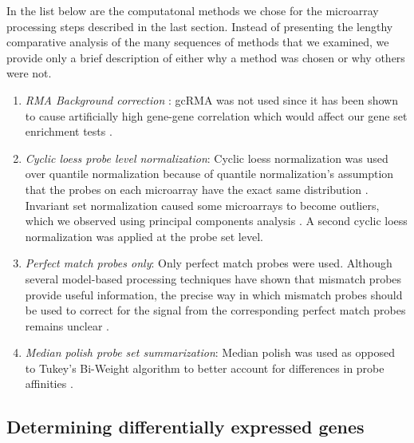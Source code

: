 In the list below are the computatonal methods we chose for the microarray
processing steps described in the last section. 
Instead of presenting the lengthy comparative analysis of the many
sequences of methods that we examined, we provide only a brief description of either 
why a method was chosen or why others were not.

\begin{enumerate}
  \item \emph{RMA Background correction} \cite{Irizarry:2003ge}: 
  gcRMA\cite{Wu:2004wh} was not used since it
  has been shown to cause artificially high gene-gene correlation which
  would affect our gene set enrichment tests \cite{Lim:2007gc}.
  
  \item \emph{Cyclic loess probe level normalization}: Cyclic loess normalization was 
  used over quantile normalization because of quantile normalization's assumption
  that the probes on each microarray have the exact same 
  distribution \cite{Ballman:2004ee}. Invariant
  set normalization caused some microarrays to become outliers, which we observed
  using principal components analysis \cite{Li:2001wk}. A second cyclic loess normalization was applied
  at the probe set level.
  
  \item \emph{Perfect match probes only}: Only perfect match probes were used.
  Although several model-based processing techniques have shown that mismatch
  probes provide useful information, the precise way in which mismatch probes should
  be used to correct for the signal from the corresponding perfect match 
  probes remains unclear \cite{Wang:2007dy}.
  
  \item \emph{Median polish probe set summarization}: Median polish was 
  used as opposed to Tukey's Bi-Weight algorithm to better account for 
  differences in probe affinities \cite{Tukey:1977uy, Affymetrix:2002vh}.
    
\end{enumerate}

\subsection{Determining differentially expressed genes}\label{S:DE}

